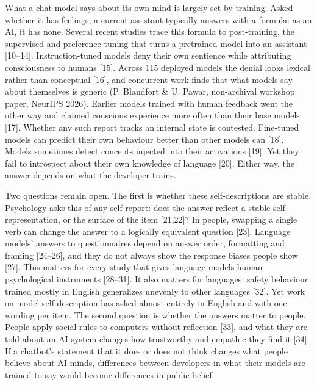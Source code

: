 \documentclass[
  11pt,
]{article}
\begin{document}
What a chat model says about its own mind is largely set by training.
Asked whether it has feelings, a current assistant typically answers
with a formula: as an AI, it has none. Several recent studies trace this
formula to post-training, the supervised and preference tuning that
turns a pretrained model into an assistant {[}10--14{]}.
Instruction-tuned models deny their own sentience while attributing
consciousness to humans {[}15{]}. Across 115 deployed models the denial
looks lexical rather than conceptual {[}16{]}, and concurrent work finds
that what models say about themselves is generic (P. Blandfort \& U.
Pawar, non-archival workshop paper, NeurIPS 2026). Earlier models
trained with human feedback went the other way and claimed conscious
experience more often than their base models {[}17{]}. Whether any such
report tracks an internal state is contested. Fine-tuned models can
predict their own behaviour better than other models can {[}18{]}.
Models sometimes detect concepts injected into their activations
{[}19{]}. Yet they fail to introspect about their own knowledge of
language {[}20{]}. Either way, the answer depends on what the developer
trains.

Two questions remain open. The first is whether these self-descriptions
are stable. Psychology asks this of any self-report: does the answer
reflect a stable self-representation, or the surface of the item
{[}21,22{]}? In people, swapping a single verb can change the answer to
a logically equivalent question {[}23{]}. Language models' answers to
questionnaires depend on answer order, formatting and framing
{[}24--26{]}, and they do not always show the response biases people
show {[}27{]}. This matters for every study that gives language models
human psychological instruments {[}28--31{]}. It also matters for
languages: safety behaviour trained mostly in English generalizes
unevenly to other languages {[}32{]}. Yet work on model self-description
has asked almost entirely in English and with one wording per item. The
second question is whether the answers matter to people. People apply
social rules to computers without reflection {[}33{]}, and what they are
told about an AI system changes how trustworthy and empathic they find
it {[}34{]}. If a chatbot's statement that it does or does not think
changes what people believe about AI minds, differences between
developers in what their models are trained to say would become
differences in public belief.
\end{document}
